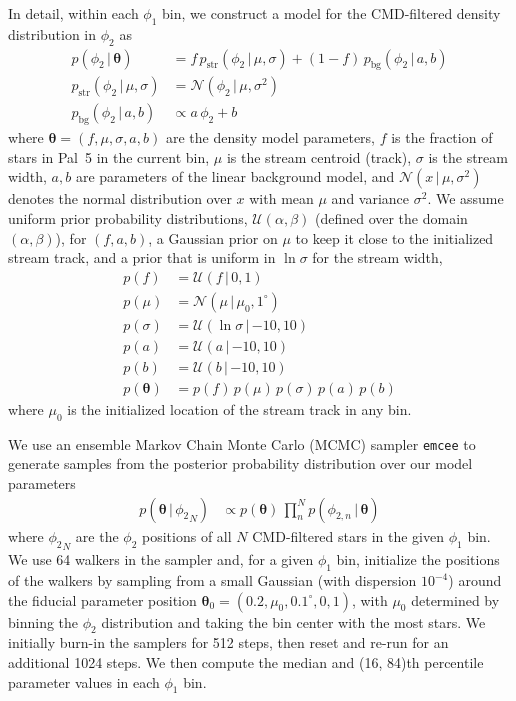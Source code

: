 \documentclass[twocolumn]{aastex62}
\newcommand{\bs}[1]{\boldsymbol{#1}}
\newcommand{\given}{\,|\,}
\begin{document}
In detail, within each $\phi_1$ bin, we construct a model for the CMD-filtered density distribution in $\phi_2$ as
\begin{align}
    p(\phi_2 \given \bs{\theta}) &=
        f \, p_{\textrm{str}}(\phi_2 \given \mu, \sigma) +
        (1-f) \, p_{\textrm{bg}}(\phi_2 \given a, b) \\
    p_{\textrm{str}}(\phi_2 \given \mu, \sigma) &=
        \mathcal{N}(\phi_2 \given \mu, \sigma^2)\\
    p_{\textrm{bg}}(\phi_2 \given a, b) &\propto
        a \, \phi_2 + b
\end{align}
where $\bs{\theta} = (f, \mu, \sigma, a, b)$ are the density model parameters, $f$ is the fraction of stars in Pal~5 in the current bin, $\mu$ is the stream centroid (track), $\sigma$ is the stream width, $a, b$ are parameters of the linear background model, and $\mathcal{N}(x \given \mu, \sigma^2)$ denotes the normal distribution over $x$ with mean $\mu$ and variance $\sigma^2$.
We assume uniform prior probability distributions, $\mathcal{U}(\alpha, \beta)$ (defined over the domain $(\alpha, \beta)$), for $(f, a, b)$, a Gaussian prior on $\mu$ to keep it close to the initialized stream track, and a prior that is uniform in $\ln \sigma$ for the stream width,
\begin{align}
    p(f) &= \mathcal{U}(f \given 0, 1)\\
    p(\mu) &= \mathcal{N}(\mu \given \mu_0, 1^\circ)\\
    p(\sigma) &= \mathcal{U}(\ln\sigma \given {-10}, 10)\\
    p(a) &= \mathcal{U}(a \given {-10}, 10)\\
    p(b) &= \mathcal{U}(b \given {-10}, 10)\\
    p(\bs{\theta}) &= p(f) \, p(\mu) \, p(\sigma) \, p(a) \, p(b)
\end{align}
where $\mu_0$ is the initialized location of the stream track in any bin.

We use an ensemble Markov Chain Monte Carlo (MCMC) sampler \texttt{emcee} \citep{Foreman-Mackey:2013} to generate samples from the posterior probability distribution over our model parameters
\begin{align}
    p(\bs{\theta} \given {\phi_2}_N) &\propto
        p(\bs{\theta}) \, \prod_n^N p(\phi_{2, n} \given \bs{\theta})
\end{align}
where ${\phi_2}_N$ are the $\phi_2$ positions of all $N$ CMD-filtered stars in the given $\phi_1$ bin.
We use 64 walkers in the sampler and, for a given $\phi_1$ bin, initialize the positions of the walkers by sampling from a small Gaussian (with dispersion $10^{-4}$) around the fiducial parameter position $\bs{\theta}_0 = (0.2, \mu_0, 0.1^\circ, 0, 1)$, with $\mu_0$ determined by binning the $\phi_2$ distribution and taking the bin center with the most stars.
We initially burn-in the samplers for 512 steps, then reset and re-run for an additional 1024 steps.
We then compute the median and (16, 84)th percentile parameter values in each $\phi_1$ bin.
\end{document}
